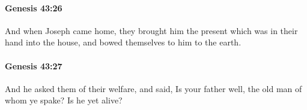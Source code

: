 		\paragraph{Genesis 43:26} %
			\label{GENESIS-43-26}

			And when Joseph came home, they brought him the present which was in their hand into the house, and bowed themselves to him to the earth.


		\paragraph{Genesis 43:27} %
			\label{GENESIS-43-27}

			And he asked them of their welfare, and said, Is your father well, the old man of whom ye spake? Is he yet alive?


